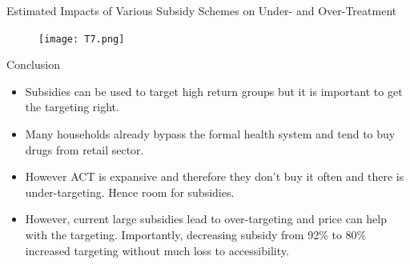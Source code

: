 \documentclass{beamer}
\begin{document}
\begin{frame}{Estimated Impacts of Various Subsidy Schemes on Under- and Over-Treatment}
    \begin{figure}
        \texttt{[image: T7.png]}
    \end{figure}
\end{frame}

\begin{frame}{Conclusion}
    \begin{itemize}
        \item Subsidies can be used to target high return groups but it is important to get the targeting right.
        \item Many households already bypass the formal health system and tend to buy drugs from retail sector.
        \item However ACT is expansive and therefore they don't buy it often and there is under-targeting. Hence room for subsidies.
        \item However, current large subsidies lead to over-targeting and price can help with the targeting. Importantly, decreasing subsidy from 92\% to 80\% increased targeting without much loss to accessibility.
    \end{itemize}
    
\end{frame}
\end{document}
